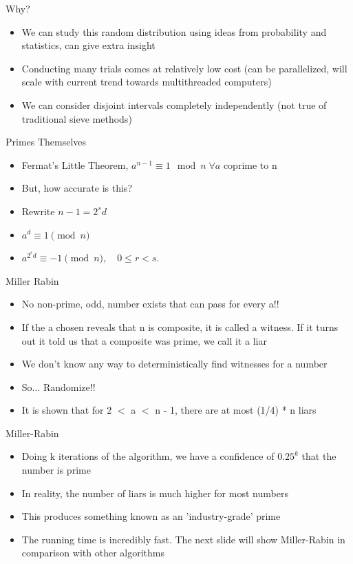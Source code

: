 \documentclass{beamer}
\begin{document}
\begin{frame}{Why?}
  \begin{itemize}
    \item We can study this random distribution using ideas from probability and statistics, can give extra insight
    \item Conducting many trials comes at relatively low cost (can be parallelized, will scale with current trend towards multithreaded computers)
    \item We can consider disjoint intervals completely independently (not true of traditional sieve methods)
  \end{itemize}
\end{frame}
\begin{frame}{Primes Themselves}
\begin{itemize}
    \item Fermat's Little Theorem, $a^{n - 1} \equiv 1 \mod n \; \forall a$ coprime to n 
    \item But, how accurate is this?
    \item Rewrite $n - 1 = 2^s d$
    \item $a^d \equiv 1 \pmod{n}$
    \item $a^{2^r d} \equiv -1 \pmod{n}, \quad 0 \leq r < s.$
\end{itemize}
\end{frame}
\begin{frame}{Miller Rabin}
\begin{itemize}
    \item No non-prime, odd, number exists that can pass for every a!!
    \item If the a chosen reveals that n is composite, it is called a witness. If it turns out it told us that a composite was prime, we call it a liar
    \item We don't know any way to deterministically find witnesses for a number
    \item So... Randomize!!
    \item It is shown that for 2 $<$ a $<$ n - 1, there are at most (1/4) * n liars
\end{itemize}
\end{frame}
\begin{frame}{Miller-Rabin}
    \begin{itemize}
        \item Doing k iterations of the algorithm, we have a confidence of $0.25^{k}$ that the number is prime
        \item In reality, the number of liars is much higher for most numbers
        \item This produces something known as an 'industry-grade' prime
        \item The running time is incredibly fast. The next slide will show Miller-Rabin in comparison with other algorithms
    \end{itemize}
\end{frame}
\end{document}
